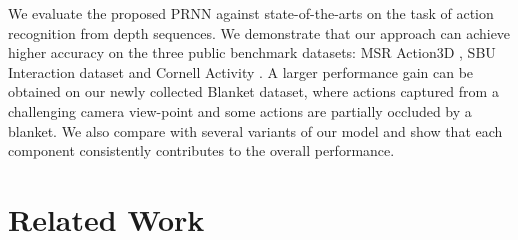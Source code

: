 \documentclass[10pt,twocolumn,letterpaper]{article}
\begin{document}







We evaluate the proposed PRNN against state-of-the-arts on the task of action recognition from depth sequences. We demonstrate that our approach can achieve higher accuracy on the three public benchmark datasets: MSR Action3D \cite{Wanqing_cvprw_2010}, SBU Interaction dataset \cite{kiwon_cvprw_2012} and Cornell Activity \cite{sung_rgbdactivity_2012}. A larger performance gain can be obtained on our newly collected Blanket dataset, where actions captured from a challenging camera view-point and some actions are partially occluded by a blanket. We also compare with several variants of our model and show that each component consistently contributes to the overall performance.  

 


\section{Related Work}
\end{document}
